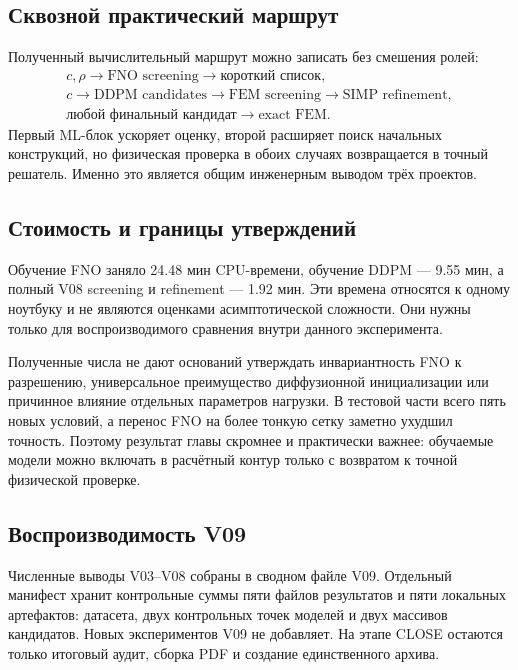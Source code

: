 \subsection{Сквозной практический маршрут}
\label{subsec:practical-v09-route}

Полученный вычислительный маршрут можно записать без смешения ролей:
\begin{equation}
\label{eq:practical-v09-final-route}
 \begin{gathered}
  c,\rho
  \longrightarrow
  \text{FNO screening}
  \longrightarrow
  \text{короткий список},
  \\
  c
  \longrightarrow
  \text{DDPM candidates}
  \longrightarrow
  \text{FEM screening}
  \longrightarrow
  \text{SIMP refinement},
  \\
  \text{любой финальный кандидат}
  \longrightarrow
  \text{exact FEM}.
 \end{gathered}
\end{equation}
Первый ML-блок ускоряет оценку, второй расширяет поиск начальных конструкций, но физическая проверка в обоих случаях возвращается в точный решатель. Именно это является общим инженерным выводом трёх проектов.

\subsection{Стоимость и границы утверждений}
\label{subsec:practical-v09-cost-scope}

Обучение FNO заняло 24.48 мин CPU-времени, обучение DDPM --- 9.55 мин, а полный V08 screening и refinement --- 1.92 мин. Эти времена относятся к одному ноутбуку и не являются оценками асимптотической сложности. Они нужны только для воспроизводимого сравнения внутри данного эксперимента.

Полученные числа не дают оснований утверждать инвариантность FNO к разрешению, универсальное преимущество диффузионной инициализации или причинное влияние отдельных параметров нагрузки. В тестовой части всего пять новых условий, а перенос FNO на более тонкую сетку заметно ухудшил точность. Поэтому результат главы скромнее и практически важнее: обучаемые модели можно включать в расчётный контур только с возвратом к точной физической проверке.

\subsection{Воспроизводимость V09}
\label{subsec:practical-v09-reproducibility}

Численные выводы V03--V08 собраны в сводном файле V09. Отдельный манифест хранит контрольные суммы пяти файлов результатов и пяти локальных артефактов: датасета, двух контрольных точек моделей и двух массивов кандидатов. Новых экспериментов V09 не добавляет. На этапе CLOSE остаются только итоговый аудит, сборка PDF и создание единственного архива.

